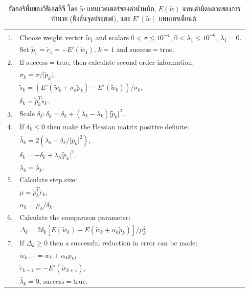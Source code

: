 \begin{table}[hbtp]
{\footnotesize %
\caption{อัลกอริทึ่มของวิธีเอสซีจี\cite{Moller1993a} โดย $\tilde{w}$ แทนเวคเตอร์ของค่าน้ำหนัก, $E(\tilde{w})$ แทนค่าผิดพลาดของการทำนาย (ฟังชั่นจุดประสงค์), และ $E'(\tilde{w})$ แทนเกรเดียนต์.}
\label{tbl: ann tips scg}
\begin{center}
\begin{tabular}{|rl|}
\hline 
& \\
1. & Choose weight vector $\tilde{w}_1$ and scalars $0 < \sigma \leq 10^{-4}$, $0 < \lambda_1 \leq 10^{-6}$, $\bar{\lambda}_1 = 0$. \\
& Set $\tilde{p}_1 = \tilde{r}_1 = -E'(\tilde{w}_1)$, $k = 1$ and $\mathrm{success} = \mathrm{true}$.\\
2. & If $\mathrm{success} = \mathrm{true}$, then calculate second order information: \\
& \;\; $\sigma_k = \sigma/\vert \tilde{p}_k \vert$, \\
& \;\; $\tilde{s}_k = (E'(\tilde{w}_k + \sigma_k \tilde{p}_k) - E'(\tilde{w}_k))/\sigma_k$, \\
& \;\; $\delta_k = \tilde{p}_k^T \tilde{s}_k$. \\
3. & Scale $\delta_k: \delta_k = \delta_k + (\lambda_k - \bar{\lambda}_k)\vert \tilde{p}_k \vert^2$. \\
4. & If $\delta_k \leq 0$ then make the Hessian matrix positive definite: \\
& \;\; $\bar{\lambda}_k = 2(\lambda_k - \delta_k/\vert \tilde{p}_k \vert^2)$,\\
& \;\; $\delta_k = -\delta_k + \lambda_k \vert \tilde{p}_k \vert^2$, \\
& \;\; $\lambda_k = \bar{\lambda}_k$. \\
5. & Calculate step size: \\
& $\mu = \tilde{p}_k^T \tilde{r}_k$, \\
& $\alpha_k = \mu_k/\delta_k$. \\
6. & Calculate the comparison parameter: \\
& $\Delta_k = 2 \delta_k [ E(\tilde{w}_k) - E(\tilde{w}_k + \alpha_k \tilde{p}_k)]/\mu_k^2$. \\
7. & If $\Delta_k \geq 0$ then a successful reduction in error can be made: \\
& \;\; $\tilde{w}_{k+1} = \tilde{w}_k + \alpha_k \tilde{p}_k$, \\
& \;\; $\tilde{r}_{k+1} = - E'(\tilde{w}_{k+1})$, \\
& \;\; $\bar{\lambda}_k = 0$, $\mathrm{success} = \mathrm{true}$. \\

\end{tabular}
\end{center}}
\end{table}
